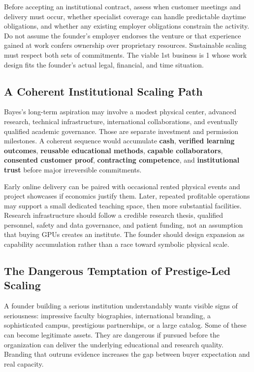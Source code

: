 Before accepting an institutional contract, assess when customer meetings and delivery must occur, whether specialist coverage can handle predictable daytime obligations, and whether any existing employer obligations constrain the activity. Do not assume the founder's employer endorses the venture or that experience gained at work confers ownership over proprietary resources. Sustainable scaling must respect both sets of commitments. The viable 1st business is 1 whose work design fits the founder's actual legal, financial, and time situation.

\subsection{A Coherent Institutional Scaling Path}
\label{sec:coherent_institutional_scaling_path}

Bayes's long-term aspiration may involve a modest physical center, advanced research, technical infrastructure, international collaborations, and eventually qualified academic governance. Those are separate investment and permission milestones. A coherent sequence would accumulate \textbf{cash}, \textbf{verified learning outcomes}, \textbf{reusable educational methods}, \textbf{capable collaborators}, \textbf{consented customer proof}, \textbf{contracting competence}, and \textbf{institutional trust} before major irreversible commitments.

Early online delivery can be paired with occasional rented physical events and project showcases if economics justify them. Later, repeated profitable operations may support a small dedicated teaching space, then more substantial facilities. Research infrastructure should follow a credible research thesis, qualified personnel, safety and data governance, and patient funding, not an assumption that buying GPUs creates an institute. The founder should design expansion as capability accumulation rather than a race toward symbolic physical scale.

\subsection{The Dangerous Temptation of Prestige-Led Scaling}
\label{sec:prestige_led_scaling_danger}

A founder building a serious institution understandably wants visible signs of seriousness: impressive faculty biographies, international branding, a sophisticated campus, prestigious partnerships, or a large catalog. Some of these can become legitimate assets. They are dangerous if pursued before the organization can deliver the underlying educational and research quality. Branding that outruns evidence increases the gap between buyer expectation and real capacity.

